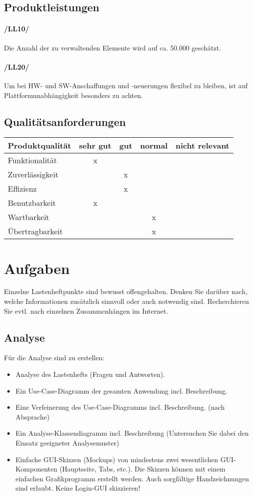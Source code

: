 \subsection{Produktleistungen}
\paragraph{/LL10/}
Die Anzahl der zu verwaltenden Elemente wird auf ca. 50.000 geschätzt.
\paragraph{/LL20/}
Um bei HW- und SW-Anschaffungen und -neuerungen flexibel zu bleiben, ist auf Plattformunabhängigkeit besonders zu achten.
\subsection{Qualitätsanforderungen}
\begin{tabular}{| l | c | c | c | c |}
    \hline
    Produktqualität & sehr gut & gut & normal & nicht relevant \\
    \hline
    Funktionalität & x & & & \\
    \hline
    Zuverlässigkeit & & x & & \\
    \hline
    Effizienz & & x & & \\
    \hline
    Benutzbarkeit & x & & & \\
    \hline
    Wartbarkeit & & & x & \\
    \hline
    Übertragbarkeit & & & x & \\
    \hline
\end{tabular}
\section{Aufgaben}
Einzelne Lastenheftpunkte sind bewusst offengehalten. Denken Sie darüber nach, welche Informationen zusätzlich sinnvoll oder auch notwendig sind. Recherchieren Sie evtl. nach einzelnen Zusammenhängen im Internet.
\subsection{Analyse}
Für die Analyse sind zu erstellen:
\begin{itemize}
    \item Analyse des Lastenhefts (Fragen und Antworten). 
    \item Ein Use-Case-Diagramm der gesamten Anwendung incl. Beschreibung.
    \item Eine Verfeinerung des Use-Case-Diagramms incl. Beschreibung. (nach Absprache)
    \item Ein Analyse-Klassendiagramm incl. Beschreibung (Untersuchen Sie dabei den Einsatz geeigneter Analysemuster)
    \item Einfache GUI-Skizzen (Mockups) von mindestens zwei wesentlichen GUI-Komponenten (Hauptseite, Tabs, etc.). Die Skizzen können mit einem einfachen Grafikprogramm erstellt werden. Auch sorgfältige Handzeichnungen sind erlaubt. Keine Login-GUI skizzieren!    
\end{itemize}

